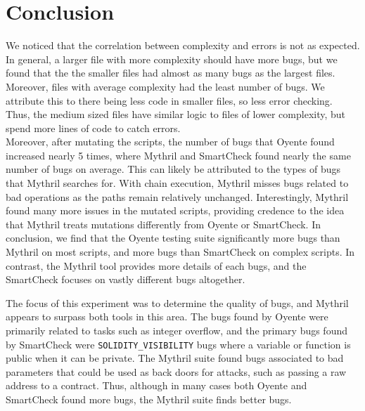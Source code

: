 \section{Conclusion}

We noticed that the correlation between complexity and errors is not as expected. In general, a larger file with more complexity should have more bugs, but we found that the the smaller files had almost as many bugs as the largest files. Moreover, files with average complexity had the least number of bugs. We attribute this to there being less code in smaller files, so less error checking. Thus, the medium sized files have similar logic to files of lower complexity, but spend more lines of code to catch errors. \\

Moreover, after mutating the scripts, the number of bugs that Oyente found increased nearly 5 times, where Mythril and SmartCheck found nearly the same number of bugs on average. This can likely be attributed to the types of bugs that Mythril searches for. With chain execution, Mythril misses bugs related to bad operations as the paths remain relatively unchanged. Interestingly, Mythril found many more issues in the mutated scripts, providing credence to the idea that Mythril treats mutations differently from Oyente or SmartCheck. In conclusion, we find that the Oyente testing suite significantly more bugs than Mythril on most scripts, and more bugs than SmartCheck on complex scripts. In contrast, the Mythril tool provides more details of each bugs, and the SmartCheck focuses on vastly different bugs altogether. 

The focus of this experiment was to determine the quality of bugs, and Mythril appears to surpass both tools in this area. The bugs found by Oyente were primarily related to tasks such as integer overflow, and the primary bugs found by SmartCheck were \texttt{SOLIDITY\_VISIBILITY} bugs where a variable or function is public when it can be private. The Mythril suite found bugs associated to bad parameters that could be used as back doors for attacks, such as passing a raw address to a contract. Thus, although in many cases both Oyente and SmartCheck found more bugs, the Mythril suite finds better bugs.


